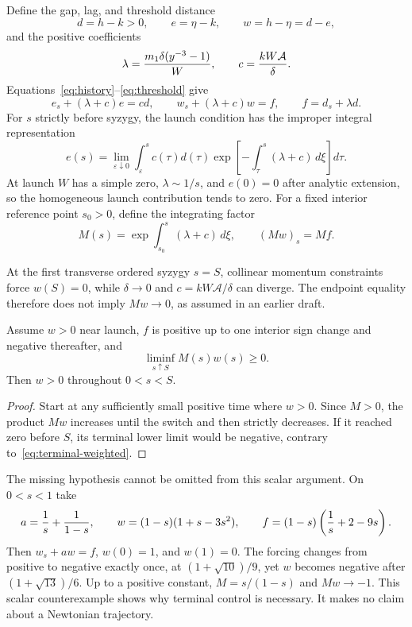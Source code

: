 Define the gap, lag, and threshold distance
\[
 d=h-k>0,\qquad e=\eta-k,\qquad w=h-\eta=d-e,
\]
and the positive coefficients
\[
 \lambda={m_1\delta(y^{-3}-1)\over W},\qquad
 c={kW\mathcal A\over\delta}.
\]
Equations~\eqref{eq:history}--\eqref{eq:threshold} give
\begin{equation}\label{eq:lag}
 e_s+(\lambda+c)e=cd,\qquad
 w_s+(\lambda+c)w=f,\qquad f=d_s+\lambda d.
\end{equation}
For $s$ strictly before syzygy, the launch condition has the improper
integral representation
\[
 e(s)=\lim_{\varepsilon\downarrow0}\int_\varepsilon^s c(\tau)d(\tau)
 \exp\!\left[-\int_\tau^s(\lambda+c)\,d\xi\right]d\tau.
\]
At launch $W$ has a simple zero, $\lambda\sim1/s$, and $e(0)=0$ after
analytic extension, so the homogeneous launch contribution tends to zero.
For a fixed interior reference point $s_0>0$, define the integrating factor
\[
 M(s)=\exp\!\int_{s_0}^s(\lambda+c)\,d\xi,
 \qquad (Mw)_s=Mf.
\]

At the first transverse ordered syzygy $s=S$, collinear momentum
constraints force $w(S)=0$, while $\delta\to0$ and
$c=kW\mathcal A/\delta$ can diverge. The endpoint equality therefore
does not imply $Mw\to0$, as assumed in an earlier draft.

\begin{lemma}
Assume $w>0$ near launch, $f$ is positive up to one interior sign change
and negative thereafter, and
\begin{equation}\label{eq:terminal-weighted}
 \liminf_{s\uparrow S} M(s)w(s)\ge0.
\end{equation}
Then $w>0$ throughout $0<s<S$.
\end{lemma}
\begin{proof}
Start at any sufficiently small positive time where $w>0$. Since $M>0$,
the product $Mw$ increases until the switch and then strictly decreases.
If it reached zero before $S$, its terminal lower limit would be negative,
contrary to~\eqref{eq:terminal-weighted}.
\end{proof}

The missing hypothesis cannot be omitted from this scalar argument.
On $0<s<1$ take
\[
 a={1\over s}+{1\over1-s},\qquad
 w=(1-s)(1+s-3s^2),\qquad
 f=(1-s)\left({1\over s}+2-9s\right).
\]
Then $w_s+aw=f$, $w(0)=1$, and $w(1)=0$. The forcing changes from positive
to negative exactly once, at $(1+\sqrt{10})/9$, yet $w$ becomes negative
after $(1+\sqrt{13})/6$. Up to a positive constant,
$M=s/(1-s)$ and $Mw\to-1$.
This scalar counterexample shows why terminal control is necessary.
It makes no claim about a Newtonian trajectory.

